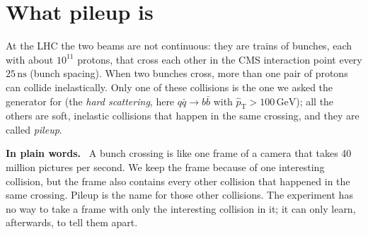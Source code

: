 \documentclass[11pt,a4paper]{article}
\newcommand{\bbbar}{\ensuremath{b\bar{b}}}
\newcommand{\GeV}{\,\mathrm{GeV}}
\newcommand{\ns}{\,\mathrm{ns}}
\newcommand{\ptHat}{\ensuremath{\hat{p}_{\mathrm{T}}}}
\newenvironment{plainwords}[1][In plain words]{%
  \par\medskip\noindent\setlength{\fboxsep}{6pt}\setlength{\fboxrule}{0.6pt}%
  \begin{lrbox}{\plainbox}\begin{minipage}{\dimexpr\textwidth-2\fboxsep-2\fboxrule\relax}\small
  \textbf{\textcolor{plainrule}{#1.}}\ \ignorespaces}{%
  \end{minipage}\end{lrbox}\noindent\fcolorbox{plainrule}{plainbg}{\usebox{\plainbox}}\par\medskip}
\begin{document}
\section{What pileup is}
\label{sec:what}

At the LHC the two beams are not continuous: they are trains of bunches, each with about $10^{11}$ protons,
that cross each other in the CMS interaction point every $25\ns$ (bunch spacing). When two bunches cross,
more than one pair of protons can collide inelastically. Only one of these collisions is the one we asked
the generator for (the \emph{hard scattering}, here $q\bar{q}\to\bbbar$ with $\ptHat>100\GeV$); all the
others are soft, inelastic collisions that happen in the same crossing, and they are called \emph{pileup}.

\begin{plainwords}
A bunch crossing is like one frame of a camera that takes 40 million pictures per second. We keep the frame
because of one interesting collision, but the frame also contains every other collision that happened in
the same crossing. Pileup is the name for those other collisions. The experiment has no way to take a frame
with only the interesting collision in it; it can only learn, afterwards, to tell them apart.
\end{plainwords}
\end{document}
